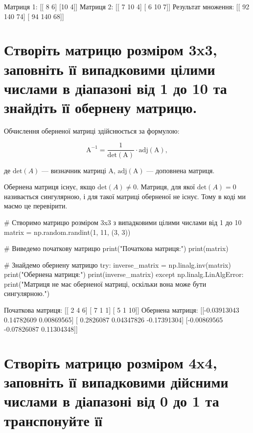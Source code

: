 \documentclass[]{article}
\newcounter{pythoncode}
\begin{document}
\begin{out}
	Матриця 1:
	[[ 8  6]
	 [10  4]]
	Матриця 2:
	[[ 7 10  4]
	 [ 6 10  7]]
	Результат множення:
	[[ 92 140  74]
	 [ 94 140  68]]
\end{out}

\section{Створіть матрицю розміром 3x3, заповніть її випадковими цілими числами в діапазоні від 1 до 10 та знайдіть її обернену матрицю.}

Обчислення оберненої матриці здійснюється за формулою:

\[ \mathrm{A}^{-1} = \frac{1}{\mathrm{det}(\mathrm{A})} \cdot \mathrm{adj}(\mathrm{A}), \]

де $ \mathrm{det}(A) $ --- визначник матриці \(\mathrm A\),
\(\mathrm{adj}(\mathrm{A})\) --- доповнена матриця.

Обернена матриця існує, якщо $ \mathrm{det}(A) \neq 0$. Матриця, для
якої $ \mathrm{det}(A) = 0$ називається сингулярною, і для такої
матриці оберненої не існує. Тому в коді ми маємо це перевірити.

\begin{pythoncode}
    # Створимо матрицю розміром 3x3 з випадковими цілими числами від 1 до 10
    matrix = np.random.randint(1, 11, (3, 3))

    # Виведемо початкову матрицю
    print("Початкова матриця:")
    print(matrix)

    # Знайдемо обернену матрицю
    try:
        inverse_matrix = np.linalg.inv(matrix)
        print("Обернена матриця:")
        print(inverse_matrix)
    except np.linalg.LinAlgError:
        print("Матриця не має оберненої матриці, оскільки вона може бути сингулярною.")
\end{pythoncode}

\begin{out}
	Початкова матриця:
	[[ 2  4  6]
	 [ 7  1  1]
	 [ 5  1 10]]
	Обернена матриця:
	[[-0.03913043  0.14782609  0.00869565]
	 [ 0.2826087   0.04347826 -0.17391304]
	 [-0.00869565 -0.07826087  0.11304348]]
\end{out}

\section{Створіть матрицю розміром 4x4, заповніть її випадковими дійсними числами в діапазоні від 0 до 1 та транспонуйте її}
\end{document}
